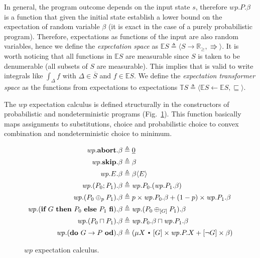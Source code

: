 \documentclass{eptcs}
\theoremstyle{plain}
\theoremstyle{definition}
\newcommand{\Real}{\ensuremath{\mathbb R}}
\newcommand{\RealPos}{\ensuremath{\Real_\geq}}
\newcommand{\lit}[1]{\ensuremath{\mathit{#1}}}
\newcommand{\TS}{\lit{\mathbb{T}S}}
\newcommand{\ES}{\lit{\mathbb{E}S}}
\newcommand{\Def}{\ensuremath{\triangleq}}
\newcommand{\Subst}[2][]
	{ \ensuremath{\ifthenelse{\equal{#1}{}}{\langle #2 \rangle}{\langle #1\mapsto #2 \rangle} }}
\newcommand{\ra}{\ensuremath{\rightarrow}}
\newcommand{\dotsep}{\mbox{\raisebox{0.4ex}{\tiny\ensuremath{\:\;\bullet\;\:}}}}
\newcommand{\Not}{\ensuremath{\neg}}
\newcommand{\Const}[1]{\ensuremath{\underline{#1}}}
\newcommand{\SubPr}[1]{\ensuremath{\overline{#1}}}
\newcommand{\Wp}{\lit{wp}}
\newcommand{\Min}{\ensuremath{\sqcap}}
\newcommand{\SKIP}[0]{\textbf{skip}}
\newcommand{\ABORT}[0]{\textbf{abort}}
\newcommand{\IF}[0]{\textbf{if}}
\newcommand{\THEN}[0]{\textbf{then}}
\newcommand{\ELSE}[0]{\textbf{else}}
\newcommand{\FI}[0]{\textbf{fi}}
\newcommand{\DO}[0]{\textbf{do}}
\newcommand{\OD}[0]{\textbf{od}}
\newcommand{\elq}{\ensuremath{\Rrightarrow}}
\begin{document}
In general, the program outcome depends on the input state $s$, therefore $\Wp.P.\beta$ is a function that given the initial state establish a lower bound on the expectation of random variable $\beta$ (it is exact in the case of a purely probabilistic program).
Therefore, expectations as functions of the input are also random variables, hence we define the \emph{expectation space} as $\ES \Def \langle S\ra\RealPos, \elq\rangle$.
It is worth noticing that all functions in $\ES$ are measurable since $S$ is taken to be denumerable (all subsets of $S$ are measurable).
This implies that is valid to write integrals like $\int_\Delta f$ with $\Delta\in\SubPr{S}$ and $f\in\ES$.
We define the \emph{expectation transformer space} as the functions from expectations to expectations $\TS \Def \langle \ES\leftarrow \ES, \sqsubseteq\rangle$.

The $\Wp$ expectation calculus is defined structurally in the constructors of probabilistic and nondeterministic programs (Fig.~\ref{fig:wp_calc}).
This function basically maps assignments to substitutions, choice and probabilistic choice to convex combination and nondeterministic choice to minimum. 
\begin{figure}[!ht]
\begin{small}
\begin{align*}
	\Wp.\ABORT.\beta &\Def \Const{0} \\
	\Wp.\SKIP.\beta &\Def \beta \\
	\Wp.E.\beta &\Def \beta\Subst{E} \\
	\Wp.(P_0;P_1).\beta &\Def \Wp.P_0.(\Wp.P_1.\beta) \\
	\Wp.(P_0 \oplus_p P_1).\beta &\Def p\times\Wp.P_0.\beta + (1-p)\times\Wp.P_1.\beta \\ 
	\Wp.(\IF\ G\ \THEN\ P_0\ \ELSE\ P_1\ \FI).\beta &\Def \Wp.(P_0\oplus_{[G]}P_1).\beta \\ 
	\Wp.(P_0 \Min P_1).\beta &\Def \Wp.P_0.\beta \Min \Wp.P_1.\beta \\ 
	\Wp.(\DO\ G\ra P\ \OD).\beta &\Def (\mu X \dotsep [G]\times \Wp.P.X + [\Not G] \times \beta)
\end{align*}
\end{small}
\caption{$\Wp$ expectation calculus.}
\label{fig:wp_calc}
\end{figure}
\end{document}
